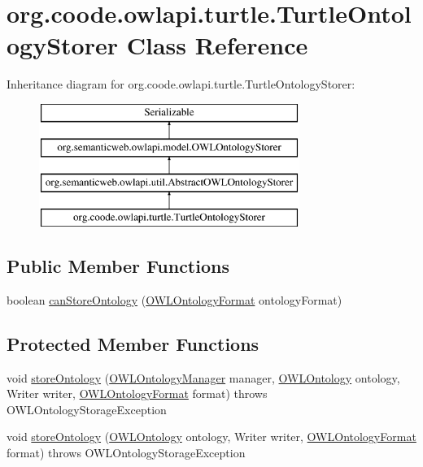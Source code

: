\hypertarget{classorg_1_1coode_1_1owlapi_1_1turtle_1_1_turtle_ontology_storer}{\section{org.\-coode.\-owlapi.\-turtle.\-Turtle\-Ontology\-Storer Class Reference}
\label{classorg_1_1coode_1_1owlapi_1_1turtle_1_1_turtle_ontology_storer}
}
Inheritance diagram for org.\-coode.\-owlapi.\-turtle.\-Turtle\-Ontology\-Storer\-:\begin{figure}[H]
\begin{center}
\leavevmode
\includegraphics[height=4.000000cm]{classorg_1_1coode_1_1owlapi_1_1turtle_1_1_turtle_ontology_storer}
\end{center}
\end{figure}
\subsection*{Public Member Functions}
\begin{DoxyCompactItemize}
\item 
boolean \hyperlink{classorg_1_1coode_1_1owlapi_1_1turtle_1_1_turtle_ontology_storer_a2e39471e44298d8222e458d04ffb2283}{can\-Store\-Ontology} (\hyperlink{classorg_1_1semanticweb_1_1owlapi_1_1model_1_1_o_w_l_ontology_format}{O\-W\-L\-Ontology\-Format} ontology\-Format)
\end{DoxyCompactItemize}
\subsection*{Protected Member Functions}
\begin{DoxyCompactItemize}
\item 
void \hyperlink{classorg_1_1coode_1_1owlapi_1_1turtle_1_1_turtle_ontology_storer_a56fe529f6124283afde1b35ff75d8603}{store\-Ontology} (\hyperlink{interfaceorg_1_1semanticweb_1_1owlapi_1_1model_1_1_o_w_l_ontology_manager}{O\-W\-L\-Ontology\-Manager} manager, \hyperlink{interfaceorg_1_1semanticweb_1_1owlapi_1_1model_1_1_o_w_l_ontology}{O\-W\-L\-Ontology} ontology, Writer writer, \hyperlink{classorg_1_1semanticweb_1_1owlapi_1_1model_1_1_o_w_l_ontology_format}{O\-W\-L\-Ontology\-Format} format)  throws O\-W\-L\-Ontology\-Storage\-Exception 
\item 
void \hyperlink{classorg_1_1coode_1_1owlapi_1_1turtle_1_1_turtle_ontology_storer_a8b60c94c0b69d08aac51da9230e8753f}{store\-Ontology} (\hyperlink{interfaceorg_1_1semanticweb_1_1owlapi_1_1model_1_1_o_w_l_ontology}{O\-W\-L\-Ontology} ontology, Writer writer, \hyperlink{classorg_1_1semanticweb_1_1owlapi_1_1model_1_1_o_w_l_ontology_format}{O\-W\-L\-Ontology\-Format} format)  throws O\-W\-L\-Ontology\-Storage\-Exception 
\end{DoxyCompactItemize}
